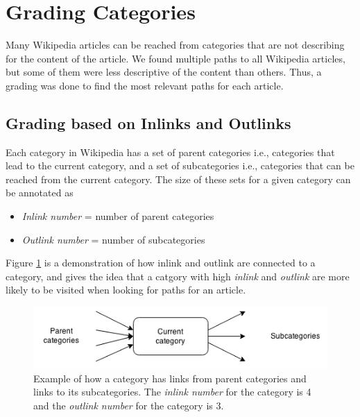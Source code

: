 
\section{Grading Categories}

Many Wikipedia articles can be reached from categories that are not describing for the content of the article. We found multiple paths to all Wikipedia articles, but some of them were less descriptive of the content than others. Thus, a grading was done to find the most relevant paths for each article. 

\subsection{Grading based on Inlinks and Outlinks}
Each category in Wikipedia has a set of parent categories i.e., categories that lead to the current category, and a set of subcategories i.e., categories that can be reached from the current category. The size of these sets for a given category can be annotated as 
\begin{itemize}
\item \emph{Inlink number} = number of parent categories
\item \emph{Outlink number} = number of subcategories
\end{itemize}
Figure \ref{fig:Categorywparentandsub2} is a demonstration of how  inlink and outlink are connected to a category, and gives the idea that a catgory with high \emph{inlink} and \emph{outlink} are more likely to be visited when looking for paths for an article. 

\begin{figure}[h]
\centering
\includegraphics[width=\textwidth]{Chapters/Methods/category_parent_sub}
\caption[Example of \emph{inlink number} and \emph{outlink number} for a category]{Example of how a category has links from parent categories and links to its subcategories. The \emph{inlink number} for the category is 4 and the \emph{outlink number} for the category is 3.}
\label{fig:Categorywparentandsub2}
\end{figure}

